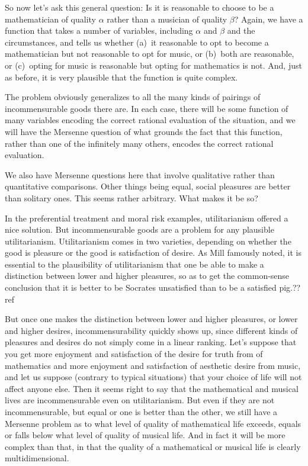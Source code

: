 So now let's ask this general question: Is it is reasonable to choose to be a mathematician of quality $\alpha$ rather than
a musician of quality $\beta$? Again, we have a function that takes a number of variables, including $\alpha$ and $\beta$
and the circumstances, and tells us whether (a)~it reasonable to opt to become a mathematician but not reasonable to opt for
music, or (b)~both are reasonable, or (c)~opting for music is reasonable but opting for mathematics is not. And, just as before,
it is very plausible that the function is quite complex.

The problem obviously generalizes to all the many kinds of pairings of incommensurable goods there are.  In each case, there 
will be some function of many variables encoding the correct rational evaluation of the situation, and we will have the Mersenne
question of what grounds the fact that this function, rather than one of the infinitely many others, encodes the correct
rational evaluation.

We also have Mersenne questions here that involve qualitative rather than quantitative comparisons. Other things being equal,
social pleasures are better than solitary ones. This seems rather arbitrary. What makes it be so?
 
In the preferential treatment and moral risk examples, utilitarianism offered a nice solution. But incommensurable goods are a problem for any plausible utilitarianism. Utilitarianism comes in two varieties, depending on whether
the good is pleasure or the good is satisfaction of desire. As Mill famously noted, it is essential to the plausibility
of utilitarianism that one be able to make a distinction between lower and higher pleasures, so as to get the common-sense
conclusion that it is better to be Socrates unsatisfied than to be a satisfied pig.??ref

But once one makes the distinction between lower and higher pleasures, or lower and higher desires, incommensurability
quickly shows up, since different kinds of pleasures and desires do not simply come in a linear ranking. Let's suppose that you get more 
enjoyment and satisfaction of the desire for truth from of mathematics and more enjoyment and satisfaction of aesthetic desire from music, and let us suppose (contrary to typical situations)
that your choice of life will not affect anyone else. Then it seems right to say that the mathematical and musical lives are
incommensurable even on utilitarianism. But even if they are not incommensurable, but equal or one is better than the other, 
we still have a Mersenne problem as to what level of quality of mathematical life exceeds, equals or falls below what level of 
quality of musical life. And in fact it will be more complex than that, in that the quality of a mathematical or musical life
is clearly multidimensional.


